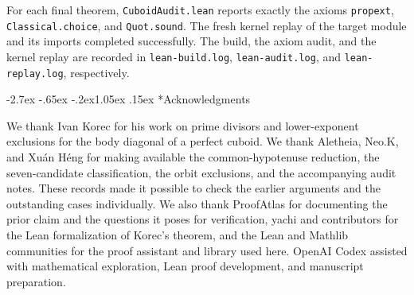 \documentclass[11pt,a4paper,twoside]{article}
\makeatletter
\numberwithin{equation}{section}
\renewcommand{\section}{\@startsection{section}{1}{\z@}%
  {-2.7ex \@plus -.65ex \@minus -.2ex}{1.05ex \@plus .15ex}%
  {\normalfont\large\bfseries}}
\makeatother
\begin{document}
For each final theorem, \texttt{CuboidAudit.\allowbreak{}lean} reports exactly the axioms \texttt{propext}, \texttt{Classical.\allowbreak{}choice}, and \texttt{Quot.\allowbreak{}sound}. The fresh kernel replay of the target module and its imports completed successfully. The build, the axiom audit, and the kernel replay are recorded in \texttt{lean-build.\allowbreak{}log}, \texttt{lean-audit.\allowbreak{}log}, and \texttt{lean-replay.\allowbreak{}log}, respectively.

\section*{Acknowledgments}

We thank Ivan Korec for his work on prime divisors and lower-exponent exclusions for the body diagonal of a perfect cuboid. We thank Aletheia, Neo.K, and Xuán Héng for making available the common-hypotenuse reduction, the seven-candidate classification, the orbit exclusions, and the accompanying audit notes. These records made it possible to check the earlier arguments and the outstanding cases individually. We also thank ProofAtlas for documenting the prior claim and the questions it poses for verification, yachi and contributors for the Lean formalization of Korec's theorem, and the Lean and Mathlib communities for the proof assistant and library used here. OpenAI Codex assisted with mathematical exploration, Lean proof development, and manuscript preparation.
\end{document}
